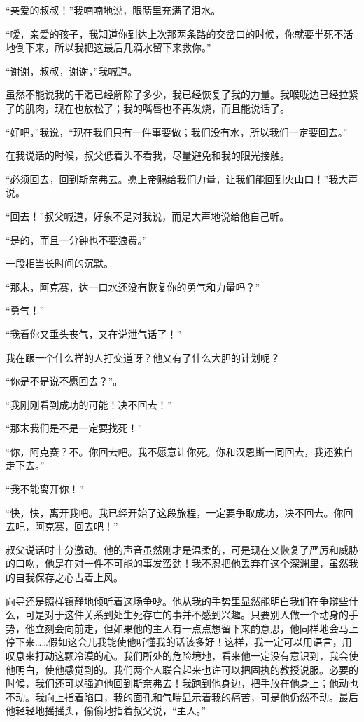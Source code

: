 \documentclass[10pt]{book}
\begin{document}
“亲爱的叔叔！”我喃喃地说，眼睛里充满了泪水。

“嗳，亲爱的孩子，我知道你到达上次那两条路的交岔口的时候，你就要半死不活地倒下来，所以我把这最后几滴水留下来救你。”

“谢谢，叔叔，谢谢，”我喊道。

虽然不能说我的干渴已经解除了多少，我已经恢复了我的力量。我喉咙边已经拉紧了的肌肉，现在也放松了；我的嘴唇也不再发烧，而且能说话了。

“好吧，”我说，“现在我们只有一件事要做；我们没有水，所以我们一定要回去。”

在我说话的时候，叔父低着头不看我，尽量避免和我的限光接触。

“必须回去，回到斯奈弗去。愿上帝赐给我们力量，让我们能回到火山口！”我大声说。

“回去！”叔父喊道，好象不是对我说，而是大声地说给他自己听。

“是的，而且一分钟也不要浪费。”

一段相当长时间的沉默。

“那末，阿克赛，达一口水还没有恢复你的勇气和力量吗？”

“勇气！”

“我看你又垂头丧气，又在说泄气话了！”

我在跟一个什么样的人打交道呀？他又有了什么大胆的计划呢？

“你是不是说不愿回去？”。

“我刚刚看到成功的可能！决不回去！”

“那末我们是不是一定要找死！”

“你，阿克赛？不。你回去吧。我不愿意让你死。你和汉恩斯一同回去，我还独自走下去。”

“我不能离开你！”

“快，快，离开我吧。我已经开始了这段旅程，一定要争取成功，决不回去。你回去吧，阿克赛，回去吧！”

叔父说话时十分激动。他的声音虽然刚才是温柔的，可是现在又恢复了严厉和威胁的口吻，他是在对一件不可能的事发蛮劲！我不忍把他丢弃在这个深渊里，虽然我的自我保存之心占着上风。

向导还是照样镇静地倾听着这场争吵。他从我的手势里显然能明白我们在争辩些什么，可是对于这件关系到处生死存亡的事并不感到兴趣。只要别人做一个动身的手势，他立刻会向前走，但如果他的主人有一点点想留下来酌意思，他同样地会马上停下来……假如这会儿我能使他听懂我的话该多好！这样，我一定可以用语言，用叹息来打动这颗冷漠的心。我们所处的危险境地，看来他一定没有意识到，我会使他明白，使他感觉到的。我们两个人联合起来也许可以把固执的教授说服。必要的时候，我们还可以强迫他回到斯奈弗去！我跑到他身边，把手放在他身上；他动也不动。我向上指着陷口，我的面孔和气喘显示着我的痛苦，可是他仍然不动。最后他轻轻地摇摇头，偷偷地指着叔父说，“主人。”
\end{document}
